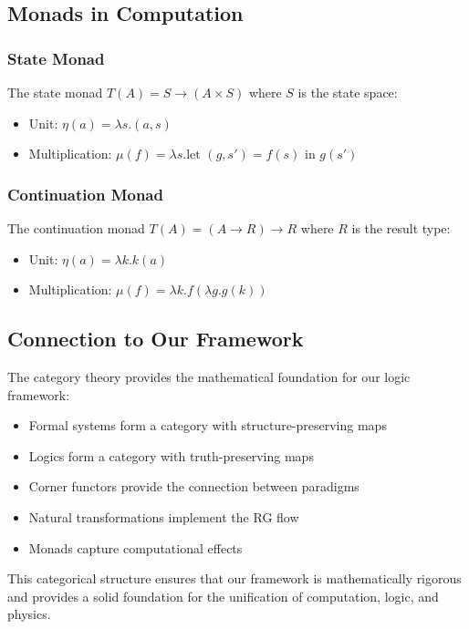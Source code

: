 \subsection{Monads in Computation}

\subsubsection{State Monad}

\begin{definition}
The state monad $T(A) = S \to (A \times S)$ where $S$ is the state space:
\begin{itemize}
\item Unit: $\eta(a) = \lambda s. (a, s)$
\item Multiplication: $\mu(f) = \lambda s. \text{let } (g, s') = f(s) \text{ in } g(s')$
\end{itemize}
\end{definition}

\subsubsection{Continuation Monad}

\begin{definition}
The continuation monad $T(A) = (A \to R) \to R$ where $R$ is the result type:
\begin{itemize}
\item Unit: $\eta(a) = \lambda k. k(a)$
\item Multiplication: $\mu(f) = \lambda k. f(\lambda g. g(k))$
\end{itemize}
\end{definition}

\subsection{Connection to Our Framework}

The category theory provides the mathematical foundation for our logic framework:

\begin{itemize}
\item Formal systems form a category with structure-preserving maps
\item Logics form a category with truth-preserving maps
\item Corner functors provide the connection between paradigms
\item Natural transformations implement the RG flow
\item Monads capture computational effects
\end{itemize}

This categorical structure ensures that our framework is mathematically rigorous and provides a solid foundation for the unification of computation, logic, and physics.
